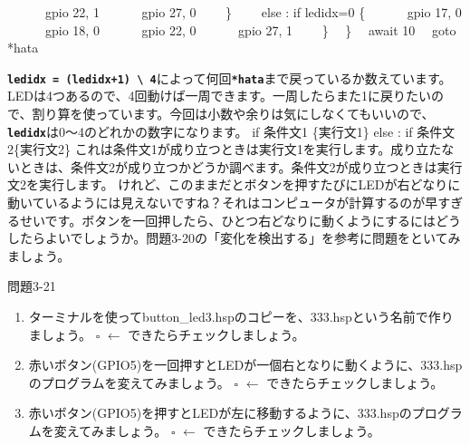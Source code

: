 \documentclass[a4paper,dvipdfmx]{jarticle}
\begin{document}
{\ \ \ \ \ \ gpio 22, 1\newline
\ \ \ \ \ \ gpio 27, 0\newline
\ \ \ \ \}\newline
\ \ \ \ else : if ledidx=0 \{\newline
\ \ \ \ \ \ gpio 17, 0\newline
\ \ \ \ \ \ gpio 18, 0\newline
\ \ \ \ \ \ gpio 22, 0\newline
\ \ \ \ \ \ gpio 27, 1\newline
\ \ \ \ \}\newline
\ \ \}\newline
\newline
\ \ await 10\newline
\ \ goto *hata\newline
}


\bigskip

\clearpage
\texttt{\textbf{ledidx = (ledidx+1) {\textbackslash}
4}}によって何回\texttt{\textbf{*hata}}まで戻っているか数えています。LEDは4つあるので、4回動けば一周できます。一周したらまた1に戻りたいので、割り算を使っています。今回は小数や余りは気にしなくてもいいので、\texttt{\textbf{ledidx}}は0〜4のどれかの数字になります。\newline
\newline
if 条件文1 \{実行文1\} else : if 条件文2\{実行文2\}\newline
これは条件文1が成り立つときは実行文1を実行します。成り立たないときは、条件文2が成り立つかどうか調べます。条件文2が成り立つときは実行文2を実行します。
\newline
\newline
けれど、このままだとボタンを押すたびにLEDが右どなりに動いているようには見えないですね？それはコンピュータが計算するのが早すぎるせいです。ボタンを一回押したら、ひとつ右どなりに動くようにするにはどうしたらよいでしょうか。問題3-20の「変化を検出する」を参考に問題をといてみましょう。

{\ttfamily
問題3-21}

\begin{enumerate}
\item
ターミナルを使ってbutton\_led3.hspのコピーを、333.hspという名前で作りましょう。\newline
${\square}$ $\leftarrow $
できたらチェックしましょう。
\item
赤いボタン(GPIO5)を一回押すとLEDが一個右となりに動くように、333.hspのプログラムを変えてみましょう。\newline
${\square}$ $\leftarrow $
できたらチェックしましょう。
\item
赤いボタン(GPIO5)を押すとLEDが左に移動するように、333.hspのプログラムを変えてみましょう。\newline
${\square}$ $\leftarrow $
できたらチェックしましょう。
\end{enumerate}
\end{document}
